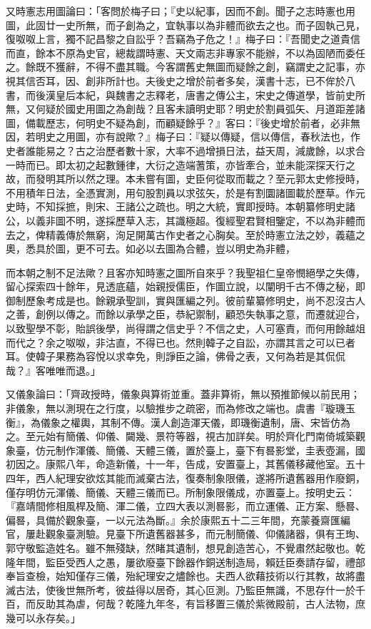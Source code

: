 \begin{pinyinscope}
又時憲志用圖論曰：「客問於梅子曰；『史以紀事，因而不創。聞子之志時憲也用圖，此固廿一史所無，而子創為之，宜執事以為非體而欲去之也。而子固執己見，復呶呶上言，獨不記昌黎之自訟乎？吾竊為子危之！』梅子曰：『吾聞史之道貴信而直，餘本不原為史官，總裁謂時憲、天文兩志非專家不能辦，不以為固陋而委任之。餘既不獲辭，不得不盡其職。今客謂舊史無圖而疑餘之創，竊謂史之記事，亦視其信否耳，因、創非所計也。夫後史之增於前者多矣，漢書十志，已不侔於八書，而後漢皇后本紀，與魏書之志釋老，唐書之傳公主，宋史之傳道學，皆前史所無，又何疑於國史用圖之為創哉？且客未讀明史耶？明史於割員弧矢、月道距差諸圖，備載歷志，何明史不疑為創，而顧疑餘乎？』客曰：『後史增於前者，必非無因，若明史之用圖，亦有說歟？』梅子曰：『疑以傳疑，信以傳信，春秋法也，作史者誰能易之？古之治歷者數十家，大率不過增損日法，益天周，減歲餘，以求合一時而已。即太初之起數鍾律，大衍之造端蓍策，亦皆牽合，並未能深探天行之故，而發明其所以然之理。本未嘗有圖，史臣何從取而載之？至元郭太史修授時，不用積年日法，全憑實測，用句股割員以求弦矢，於是有割圜諸圖載於歷草。作元史時，不知採摭，則宋、王諸公之疏也。明之大統，實即授時。本朝纂修明史諸公，以義非圖不明，遂採歷草入志，其識極超。復經聖君賢相鑒定，不以為非體而去之，俾精義傳於無窮，洵足開萬古作史者之心胸矣。至於時憲立法之妙，義蘊之奧，悉具於圖，更不可去。如必以去圖為合體，豈以明史為非體，

而本朝之制不足法歟？且客亦知時憲之圖所自來乎？我聖祖仁皇帝憫絕學之失傳，留心探索四十餘年，見透底蘊，始親授儒臣，作圖立說，以闡明千古不傳之秘，即御制歷象考成是也。餘親承聖訓，實與匯編之列。彼前輩纂修明史，尚不忍沒古人之善，創例以傳之。而餘以承學之臣，恭紀禦制，顧恐失執事之意，而遷就迎合，以致聖學不彰，貽誤後學，尚得謂之信史乎？不信之史，人可塞責，而何用餘越俎而代之？余之呶呶，非沽直，不得已也。然則韓子之自訟，亦謂其言之可以已者耳。使韓子果務為容悅以求幸免，則諍臣之論，佛骨之表，又何為若是其侃侃哉？』客唯唯而退。」

又儀象論曰：「齊政授時，儀象與算術並重。蓋非算術，無以預推節候以前民用；非儀象，無以測現在之行度，以驗推步之疏密，而為修改之端也。虞書『璇璣玉衡』，為儀象之權輿，其制不傳。漢人創造渾天儀，即璣衡遺制，唐、宋皆仿為之。至元始有簡儀、仰儀、闚幾、景符等器，視古加詳矣。明於齊化門南倚城築觀象臺，仿元制作渾儀、簡儀、天體三儀，置於臺上，臺下有晷影堂，圭表壺漏，國初因之。康熙八年，命造新儀，十一年，告成，安置臺上，其舊儀移藏他室。五十四年，西人紀理安欲炫其能而滅棄古法，復奏制象限儀，遂將所遺舊器用作廢銅，僅存明仿元渾儀、簡儀、天體三儀而已。所制象限儀成，亦置臺上。按明史云：『嘉靖間修相風桿及簡、渾二儀，立四大表以測晷影，而立運儀、正方案、懸晷、偏晷，具備於觀象臺，一以元法為斷。』余於康熙五十二三年間，充蒙養齋匯編官，屢赴觀象臺測驗。見臺下所遺舊器甚多，而元制簡儀、仰儀諸器，俱有王珣、郭守敬監造姓名。雖不無殘缺，然睹其遺制，想見創造苦心，不覺肅然起敬也。乾隆年間，監臣受西人之愚，屢欲廢臺下餘器作銅送制造局，賴廷臣奏請存留，禮部奉旨查檢，始知僅存三儀，殆紀理安之燼餘也。夫西人欲藉技術以行其教，故將盡滅古法，使後世無所考，彼益得以居奇，其心叵測。乃監臣無識，不思存什一於千百，而反助其為虐，何哉？乾隆九年冬，有旨移置三儀於紫微殿前，古人法物，庶幾可以永存矣。」


\end{pinyinscope}
